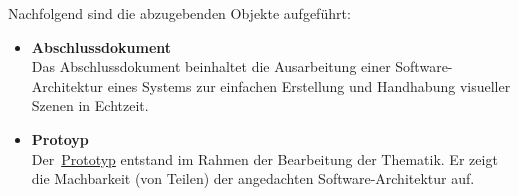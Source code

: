 Nachfolgend sind die abzugebenden Objekte aufgeführt:
\begin{itemize}
    \item \textbf{Abschlussdokument} \\
        Das Abschlussdokument beinhaltet die Ausarbeitung einer
        Software-Architektur eines Systems zur einfachen Erstellung und
        Handhabung visueller Szenen in Echtzeit.
    \item \textbf{Protoyp} \\
        Der~\hyperref[chap:prototype]{Prototyp} entstand im Rahmen der
        Bearbeitung der Thematik. Er zeigt die Machbarkeit (von Teilen) der
        angedachten Software-Architektur auf.
\end{itemize}
